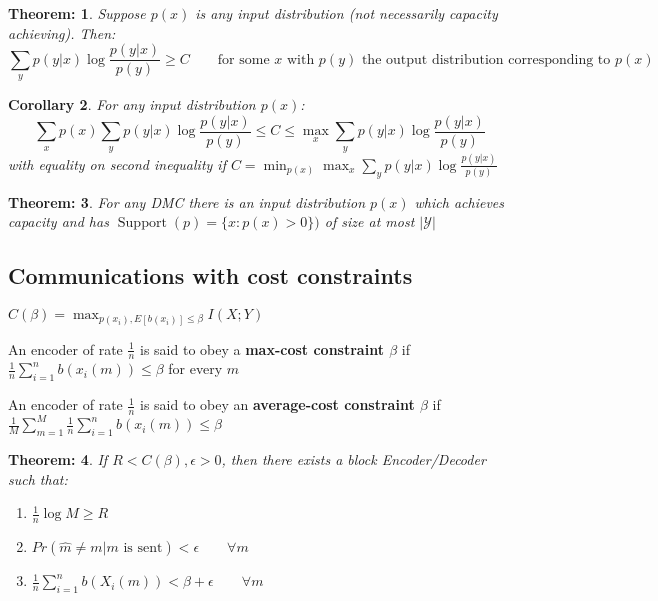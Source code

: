 \documentclass[11pt, a4paper]{scrartcl}
\newtheorem{theorem}{Theorem:}[section]
\newtheorem{corollary}[theorem]{Corollary}
\newenvironment{definition}[1][Definition]{\begin{trivlist}
\item[\hskip \labelsep {\bfseries #1}]}{\end{trivlist}}
\begin{document}
\begin{theorem}
Suppose $p(x)$ is any input distribution (not necessarily capacity achieving). Then: 
$$ \sum_y p(y|x) \log \frac{p(y|x)}{p(y)} \geq C\qquad \text{for some }x \text{ with $p(y)$ the output distribution corresponding to $p(x)$}$$ 
\end{theorem}

\begin{corollary} For any input distribution $p(x)$: 
$$ \sum_x p(x) \sum_y p(y|x) \log \frac{p(y|x)}{p(y)} \leq C \leq  \max_x \sum_y p(y|x) \log \frac{p(y|x)}{p(y)}$$
with equality on second inequality if $C= \min_{p(x)} \max_x \sum_y p(y|x) \log \frac{p(y|x)}{p(y)}$
\end{corollary}

\begin{theorem}
For any DMC there is an input distribution $p(x)$ which achieves capacity and has $\operatorname{Support}(p)= \{x:p(x)>0\})$ of size at most $|\mathcal Y|$
\end{theorem}

\subsection{Communications with cost constraints}

$\displaystyle C(\beta) = \max_{p(x_i), E[b(x_i)]\leq \beta} I(X;Y)$

\begin{definition} An encoder of rate $\frac 1n$ is said to obey a \textbf{max-cost constraint $\beta$} if $\frac 1n \sum_{i=1}^n b(x_i(m)) \leq \beta$ for every $m$ 
\end{definition}

\begin{definition} An encoder of rate $\frac 1n$ is said to obey an \textbf{average-cost constraint $\beta$} if $\frac 1M \sum_{m=1}^M \frac 1n \sum_{i=1}^n b(x_i(m)) \leq \beta$
\end{definition}


\begin{theorem}
If $R<C(\beta), \epsilon >0$, then there exists a block Encoder/Decoder such that: 
\begin{enumerate}
\item $\frac1n \log M \geq R$
\item $Pr(\hat m \neq m |m\text{ is sent})<\epsilon \qquad \forall m$
\item $\frac 1n \sum_{i=1}^n b(X_i(m))< \beta + \epsilon \qquad \forall m$
\end{enumerate}
\end{theorem}
\end{document}

